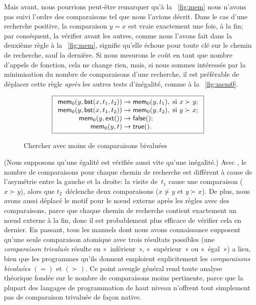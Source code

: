 Mais avant, nous pourrions peut-être remarquer qu'à la
\fig~\vref{fig:mem} nous n'avons pas suivi l'ordre des comparaisons
tel que nous l'avions décrit. Dans le cas d'une recherche positive, la
comparaison \(y = x\) est vraie exactement une fois, à la fin; par
conséquent, la vérifier avant les autres, comme nous l'avons fait dans
la deuxième règle à la \fig~\vref{fig:mem}, signifie qu'elle échoue
pour toute clé sur le chemin de recherche, sauf la dernière. Si nous
mesurons le coût en tant que nombre d'appels de fonction, cela ne
change rien, mais, si nous sommes intéressés par la minimisation du
nombre de comparaisons d'une recherche, il est préférable de déplacer
cette règle \emph{après} les autres tests d'inégalité, comme à la
\fig~\vref{fig:mem0}.
\begin{figure}
\begin{equation*}
\boxed{
\begin{array}{r@{\;}l@{\;}l}
\fun{mem}_0(y,\fun{bst}(x,t_1,t_2)) & \rightarrow &
  \fun{mem}_0(y,t_1), \; \text{si \(x \succ y\)};\\
\fun{mem}_0(y,\fun{bst}(x,t_1,t_2)) & \rightarrow &
  \fun{mem}_0(y,t_2),\; \text{si \(y \succ x\)};\\
\fun{mem}_0(y,\fun{ext}()) & \rightarrow & \fun{false}();\\
\fun{mem}_0(y,t) & \rightarrow & \fun{true}().
\end{array}}
\end{equation*}
\caption{Chercher avec moins de comparaisons bivaluées\label{fig:mem0}}
\end{figure}
(Nous supposons qu'une égalité est vérifiée aussi vite qu'une
inégalité.) Avec , le
nombre de comparaisons pour chaque chemin de recherche est différent à
cause de l'asymétrie entre la gauche et la droite: la visite
de~\(t_1\) cause une comparaison (\(x \succ y\)), alors que
\(t_2\)~déclenche deux comparaisons (\(x \nsucc y\) et \(y \succ
x\)). De plus, nous avons aussi déplacé le motif pour le n{\oe}ud
externe après les règles avec des comparaisons, parce que chaque
chemin de recherche contient exactement un n{\oe}ud externe à la fin,
donc il est probablement plus efficace de vérifier cela en dernier. En
passant, tous les manuels dont nous avons connaissance supposent
qu'une seule comparaison atomique avec trois résultats possibles (une
\emph{comparaison trivaluée} résulte en «~inférieur~», «~supérieur~» ou
«~égal~») a lieu, bien que les programmes qu'ils donnent emploient
explicitement les \emph{comparaisons bivaluées} \((=)\) et
\((\succ)\). Ce point aveugle général rend toute analyse théorique
fondée sur le nombre de comparaisons moins pertinente, parce que la
plupart des langages de programmation de haut niveau n'offrent tout
simplement pas de comparaison trivaluée de façon native.

